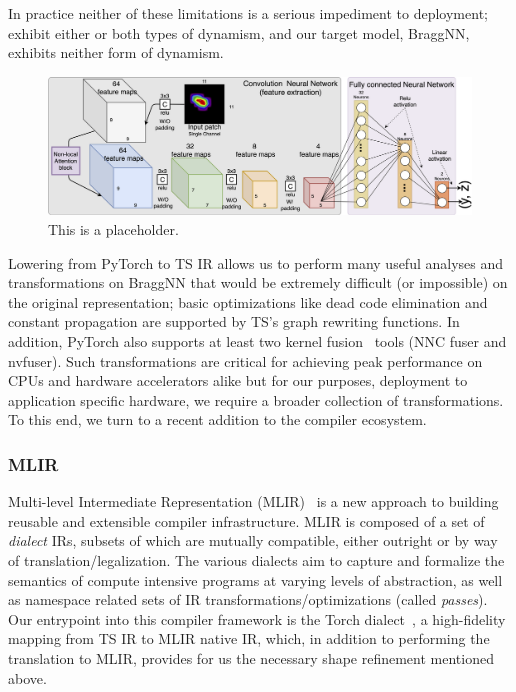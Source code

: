 In practice neither of these limitations is a serious impediment to deployment;  exhibit either or both types of dynamism, and our target model, BraggNN, exhibits neither form of dynamism.
\begin{figure}
  \includegraphics[width=\textwidth]{figures/BraggNN}
  \caption{This is a placeholder.}
\end{figure}
Lowering from PyTorch to TS IR allows us to perform many useful analyses and transformations on BraggNN that would be extremely difficult (or impossible) on the original representation;
basic optimizations like dead code elimination and constant propagation are supported by TS's graph rewriting functions.
In addition, PyTorch also supports at least two kernel fusion~\cite{10.1145/2688500.2688521} tools (NNC fuser and nvfuser).
Such transformations are critical for achieving peak performance on CPUs and hardware accelerators alike but for our purposes, deployment to application specific hardware, we require a broader collection of transformations.
To this end, we turn to a recent addition to the compiler ecosystem.

\subsubsection{MLIR}\label{subsec:mlir}

Multi-level Intermediate Representation (MLIR)~\cite{https://doi.org/10.48550/arxiv.2002.11054} is a new approach to building reusable and extensible compiler infrastructure.
MLIR is composed of a set of \emph{dialect} IRs, subsets of which are mutually compatible, either outright or by way of translation/legalization.
The various dialects aim to capture and formalize the semantics of compute intensive programs at varying levels of abstraction, as well as namespace related sets of IR transformations/optimizations (called \emph{passes}).
Our entrypoint into this compiler framework is the Torch dialect~\cite{torch-mlir}, a high-fidelity mapping from TS IR to MLIR native IR, which, in addition to performing the translation to MLIR, provides for us the necessary shape refinement mentioned above.

